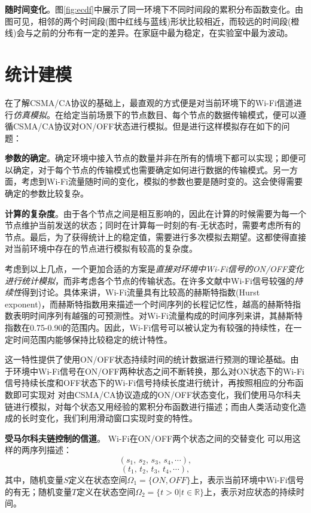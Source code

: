 \textbf{随时间变化}。图\ref{fig:ecdf}中展示了同一环境下不同时间段的累积分布函数变化。由图可见，相邻的两个时间段(图中红线与蓝线)形状比较相近，而较远的时间段(橙线)会与之前的分布有一定的差异。在家庭中最为稳定，在实验室中最为波动。
\section{统计建模}
\label{sec:model}
在了解CSMA/CA协议的基础上，最直观的方式便是对当前环境下的Wi-Fi信道进行\emph{仿真模拟}。在给定当前场景下的节点数目、每个节点的数据传输模式，便可以遵循CSMA/CA协议对ON/OFF状态进行模拟。但是进行这样模拟存在如下的问题：

\textbf{参数的确定}。确定环境中接入节点的数量并非在所有的情境下都可以实现；即便可以确定，对于每个节点的传输模式也需要确定如何进行数据的传输模式。另一方面，考虑到Wi-Fi流量随时间的变化，模拟的参数也要是随时变的。这会使得需要确定的参数比较复杂。

\textbf{计算的复杂度}。由于各个节点之间是相互影响的，因此在计算的时候需要为每一个节点维护当前发送的状态；同时在计算每一时刻的有-无状态时，需要考虑所有的节点。最后，为了获得统计上的稳定值，需要进行多次模拟去期望。这都使得直接对当前环境中存在的节点进行模拟有较高的复杂度。

考虑到以上几点，一个更加合适的方案是\emph{直接对环境中Wi-Fi信号的ON/OFF变化进行统计模拟}，而非考虑各个节点的传输状态。在许多文献\cite{}中Wi-Fi信号较强的\emph{持续性}得到讨论。具体来讲，Wi-Fi流量具有比较高的赫斯特指数(Hurst exponent)，而赫斯特指数用来描述一个时间序列的长程记忆性，越高的赫斯特指数表明时间序列有越强的可预测性。对Wi-Fi流量构成的时间序列来讲，其赫斯特指数在0.75-0.90的范围内。因此，Wi-Fi信号可以被认定为有较强的持续性，在一定时间范围内能够保持比较稳定的统计特性。

这一特性提供了使用ON/OFF状态持续时间的统计数据进行预测的理论基础。由于环境中Wi-Fi信号在ON/OFF两种状态之间不断转换，那么对ON状态下的Wi-Fi信号持续长度和OFF状态下的Wi-Fi信号持续长度进行统计，再按照相应的分布函数即可实现对
对由CSMA/CA协议造成的ON/OFF状态变化，我们使用马尔科夫链进行模拟，对每个状态又用经验的累积分布函数进行描述；而由人类活动变化造成的长时变化，我们利用滑动窗口实现时变的特性。

\textbf{受马尔科夫链控制的信道}。
Wi-Fi在ON/OFF两个状态之间的交替变化
可以用这样的两序列描述：
\begin{equation}
\label{equ:state}
(s_1, \,  s_2, \, s_3 , \, s_4, \cdots),
\end{equation}
\begin{equation}
\label{equ:time}
(t_{1}, \, t_{2}, \, t_{3}, \, t_{4}, \cdots),
\end{equation}
其中，随机变量$S$定义在状态空间$\Omega_1 = \{ON,OFF\}$上，表示当前环境中Wi-Fi信号的有无；随机变量$T$定义在状态空间$\Omega_2 = \{t > 0 | t \in \mathbb{R}\}$上，表示对应状态的持续时间。

